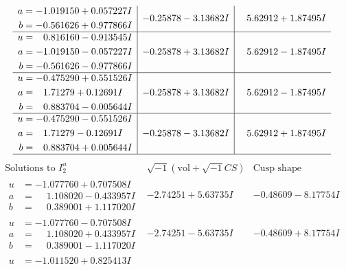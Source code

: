 \documentclass[1p]{elsarticle_modified}
\theoremstyle{definition}
\newcommand{\I}{\sqrt{-1}}
\begin{document}
$$\begin{array}{c|c|c}
\begin{aligned}
a &= -1.019150 + 0.057227 I \\
b &= -0.561626 + 0.977866 I\end{aligned}
 & -0.25878 - 3.13682 I & \phantom{-}5.62912 + 1.87495 I \\ \hline\begin{aligned}
u &= \phantom{-}0.816160 - 0.913545 I \\
a &= -1.019150 - 0.057227 I \\
b &= -0.561626 - 0.977866 I\end{aligned}
 & -0.25878 + 3.13682 I & \phantom{-}5.62912 - 1.87495 I \\ \hline\begin{aligned}
u &= -0.475290 + 0.551526 I \\
a &= \phantom{-}1.71279 + 0.12691 I \\
b &= \phantom{-}0.883704 - 0.005644 I\end{aligned}
 & -0.25878 + 3.13682 I & \phantom{-}5.62912 - 1.87495 I \\ \hline\begin{aligned}
u &= -0.475290 - 0.551526 I \\
a &= \phantom{-}1.71279 - 0.12691 I \\
b &= \phantom{-}0.883704 + 0.005644 I\end{aligned}
 & -0.25878 - 3.13682 I & \phantom{-}5.62912 + 1.87495 I\\
 \hline 
 \end{array}$$\newpage$$\begin{array}{c|c|c}  
\text{Solutions to }I^u_{2}& \I (\text{vol} + \sqrt{-1}CS) & \text{Cusp shape}\\
 \hline 
\begin{aligned}
u &= -1.077760 + 0.707508 I \\
a &= \phantom{-}1.108020 - 0.433957 I \\
b &= \phantom{-}0.389001 + 1.117020 I\end{aligned}
 & -2.74251 + 5.63735 I & -0.48609 - 8.17754 I \\ \hline\begin{aligned}
u &= -1.077760 - 0.707508 I \\
a &= \phantom{-}1.108020 + 0.433957 I \\
b &= \phantom{-}0.389001 - 1.117020 I\end{aligned}
 & -2.74251 - 5.63735 I & -0.48609 + 8.17754 I \\ \hline\begin{aligned}
u &= -1.011520 + 0.825413 I \\

\end{aligned}
\end{array}$$
\end{document}
